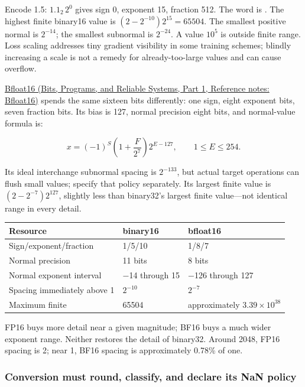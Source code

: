 Encode 1.5: \(1.1_2\,2^0\) gives sign 0, exponent 15, fraction 512. The word is . The highest finite binary16 value is \((2-2^{-10})2^{15}=65504\). The smallest positive normal is \(2^{-14}\); the smallest subnormal is \(2^{-24}\). A value \(10^5\) is outside finite range. Loss scaling addresses tiny gradient visibility in some training schemes; blindly increasing a scale is not a remedy for already-too-large values and can cause overflow.

\href{../01-Bits-Programs-and-Reliable-Systems-P01/main.pdf\#appendix-18b8dd966b5d}{Bfloat16 (Bits, Programs, and Reliable Systems, Part 1, Reference notes: Bfloat16)} spends the same sixteen bits differently: one sign, eight exponent bits, seven fraction bits. Its bias is 127, normal precision eight bits, and normal-value formula is:

\[
x=(-1)^S\left(1+\frac{F}{2^7}\right)2^{E-127},
\qquad1\le E\le254.
\]

Its ideal interchange subnormal spacing is \(2^{-133}\), but actual target operations can flush small values; specify that policy separately. Its largest finite value is \((2-2^{-7})2^{127}\), slightly less than binary32's largest finite value---not identical range in every detail.

{\def\LTcaptype{none} %
\begin{longtable}[]{@{}lll@{}}
\toprule\noalign{}
Resource & binary16 & bfloat16 \\
\midrule\noalign{}
\endhead
\bottomrule\noalign{}
\endlastfoot
Sign/exponent/fraction & 1/5/10 & 1/8/7 \\
Normal precision & 11 bits & 8 bits \\
Normal exponent interval & −14 through 15 & −126 through 127 \\
Spacing immediately above 1 & \(2^{-10}\) & \(2^{-7}\) \\
Maximum finite & 65504 & approximately \(3.39\times10^{38}\) \\
\end{longtable}
}

FP16 buys more detail near a given magnitude; BF16 buys a much wider exponent range. Neither restores the detail of binary32. Around 2048, FP16 spacing is 2; near 1, BF16 spacing is approximately 0.78\% of one.

\subsubsection{Conversion must round, classify, and declare its NaN policy}\label{05-engine-i-ch001-conversion-must-round-classify-and-declare-its-nan-policy}

